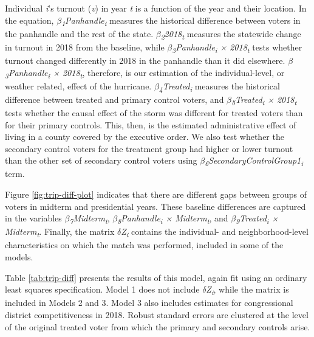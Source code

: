 \documentclass[
  12pt,
]{article}
\begin{document}
Individual \emph{i}'s turnout (\emph{v}) in year \emph{t} is a function of the year and their location. In the equation, \emph{\(\beta\)\textsubscript{1}Panhandle\textsubscript{i}} measures the historical difference between voters in the panhandle and the rest of the state. \emph{\(\beta\)\textsubscript{2}2018\textsubscript{t}} measures the statewide change in turnout in 2018 from the baseline, while \emph{\(\beta\)\textsubscript{3}Panhandle\textsubscript{i} × 2018\textsubscript{t}} tests whether turnout changed differently in 2018 in the panhandle than it did elsewhere. \emph{\(\beta\)\textsubscript{3}Panhandle\textsubscript{i} × 2018\textsubscript{t}}, therefore, is our estimation of the individual-level, or weather related, effect of the hurricane. \emph{\(\beta\)\textsubscript{4}Treated\textsubscript{i}} measures the historical difference between treated and primary control voters, and \emph{\(\beta\)\textsubscript{5}Treated\textsubscript{i} × 2018\textsubscript{t}} tests whether the causal effect of the storm was different for treated voters than for their primary controls. This, then, is the estimated administrative effect of living in a county covered by the executive order. We also test whether the secondary control voters for the treatment group had higher or lower turnout than the other set of secondary control voters using \emph{\(\beta\)\textsubscript{6}SecondaryControlGroup1\textsubscript{i}} term.

Figure \ref{fig:trip-diff-plot} indicates that there are different gaps between groups of voters in midterm and presidential years. These baseline differences are captured in the variables \emph{\(\beta\)\textsubscript{7}Midterm\textsubscript{t}}, \emph{\(\beta\)\textsubscript{8}Panhandle\textsubscript{i} × Midterm\textsubscript{t}}, and \emph{\(\beta\)\textsubscript{9}Treated\textsubscript{i} × Midterm\textsubscript{t}}. Finally, the matrix \emph{\(\delta\)Z\textsubscript{i}} contains the individual- and neighborhood-level characteristics on which the match was performed, included in some of the models.

Table \ref{tab:trip-diff} presents the results of this model, again fit using an ordinary least squares specification. Model 1 does not include \emph{\(\delta\)Z\textsubscript{i}}, while the matrix is included in Models 2 and 3. Model 3 also includes estimates for congressional district competitiveness in 2018. Robust standard errors are clustered at the level of the original treated voter from which the primary and secondary controls arise.
\end{document}
